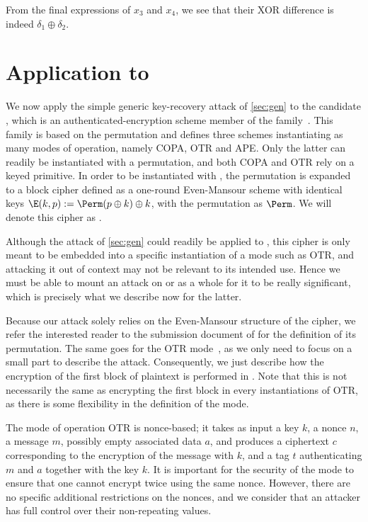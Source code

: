 From the final expressions of $x_3$ and $x_4$, we see that their XOR difference is indeed $\delta_1 \oplus \delta_2$.

\section{Application to \proestotr}
\label{sec:appli}

We now apply the simple generic key-recovery attack of \autoref{sec:gen} to the \caesar candidate \proestotr, which is an authenticated-encryption
scheme member of the \proest family~\cite{proest}. This family is based on the \proest permutation and defines
three schemes instantiating as many modes of operation, namely COPA, OTR and APE. Only
the latter can readily be instantiated with a permutation, and both COPA and OTR rely on a keyed primitive. In order
to be instantiated with \proest, the permutation is expanded to a block cipher
defined as a one-round Even-Mansour scheme with identical keys
$\E(k,p) := \Perm(p \oplus k) \oplus k$,
with the \proest permutation as $\Perm$. We will denote this cipher as \proestem.

Although the attack of \autoref{sec:gen} could readily be applied to \proestem, this cipher is only
meant to be embedded into a specific instantiation of a mode such as OTR, and attacking it out of context may not
be relevant to its intended use.
Hence we must
be able to mount an attack on \proestcopa or \proestotr as a whole for it to be really significant,
which is precisely what we describe now for the latter.

Because our attack solely relies on the Even-Mansour structure of the cipher, we refer the interested reader to the
submission document of \proest for the definition of its permutation.
The same goes for the OTR mode~\cite{M14}, as we only need to focus on a small part to describe the attack.
Consequently, we just describe how the encryption of the first block of plaintext is performed in \proestotr. Note that this is not necessarily the
same as encrypting the first block in every instantiations of OTR, as there is some flexibility in the definition of the mode.

\medskip

The mode of operation OTR is nonce-based; it takes as input a key $k$, a nonce $n$, a message $m$,
possibly empty associated data $a$, and produces a ciphertext $c$ corresponding
to the encryption of the message with $k$, and a tag $t$ authenticating $m$ and
$a$ together with the key $k$. It is important for the security of the mode to ensure
that one cannot encrypt twice using the same nonce. However, there are no
specific additional restrictions on the nonces, and we consider that an attacker
has full control over their non-repeating values.

